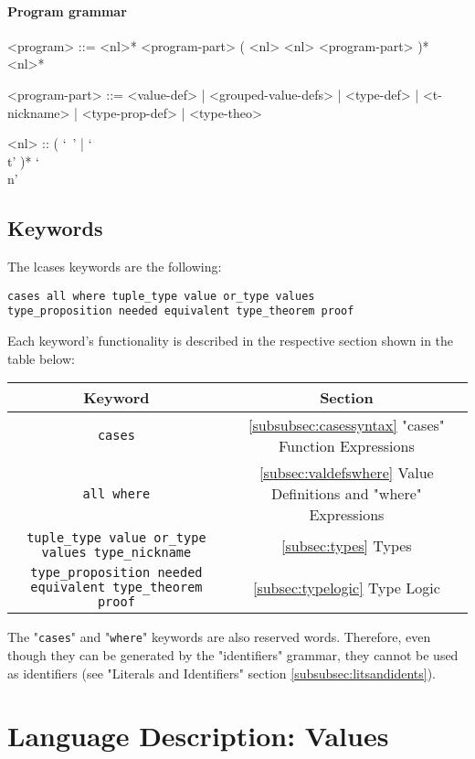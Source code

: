 \documentclass{article}
\begin{document}
\paragraph{Program grammar}
\begin{grammar}
<program> ::=
<nl>* <program-part> ( <nl> <nl> <program-part> )* <nl>*

<program-part> ::=
<value-def> | <grouped-value-defs> | <type-def> | <t-nickname> |
<type-prop-def> | <type-theo>

<nl> :: ( `\ ' | `\\t' )* `\\n'
\end{grammar}

\subsection{Keywords}

The lcases keywords are the following:
\begin{verbatim}
cases all where tuple_type value or_type values
type_proposition needed equivalent type_theorem proof
\end{verbatim}
Each keyword's functionality is described in the respective section shown in
the table below:

\begin{center}
\begin{tabular}{ |c|c| }
\hline
Keyword & Section
\\
\hline
\hline
\verb|cases| & \ref{subsubsec:casessyntax} "cases" Function Expressions
\\
\hline
\verb|all where| & \ref{subsec:valdefswhere}
Value Definitions and "where" Expressions
\\
\hline
\verb|tuple_type value or_type values type_nickname| &
\ref{subsec:types} Types
\\
\hline
\verb|type_proposition needed equivalent type_theorem proof| &
{\ref{subsec:typelogic} Type Logic}
\\
\hline
\end{tabular}
\end{center}
The "\verb|cases|" and "\verb|where|" keywords are also
reserved words. Therefore, even though they can be generated by the
"identifiers" grammar, they cannot be used as identifiers (see "Literals and
Identifiers" section \ref{subsubsec:litsandidents}).

\newpage
\section{Language Description: Values}
\end{document}
